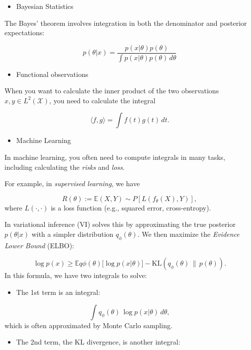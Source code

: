 \documentclass[
  letterpaper,
  DIV=11,
  numbers=noendperiod]{scrreprt}
\providecommand{\tightlist}{%
  \setlength{\itemsep}{0pt}\setlength{\parskip}{0pt}}
\begin{document}
\begin{itemize}
\tightlist
\item
  Bayesian Statistics
\end{itemize}

The Bayes' theorem involves integration in both the denominator and
posterior expectations:

\[
p(\theta|x) = \frac{p(x|\theta)p(\theta)}{\int p(x|\theta)p(\theta)\,d\theta}
\]

\begin{itemize}
\tightlist
\item
  Functional observations
\end{itemize}

When you want to calculate the inner product of the two observations
\(x,y\in L^2(\mathcal X)\), you need to calculate the integral

\[
\langle f,g \rangle = \int f(t)g(t)\,dt.
\]

\begin{itemize}
\tightlist
\item
  Machine Learning
\end{itemize}

In machine learning, you often need to compute integrals in many tasks,
including calculating the \emph{risks} and \emph{loss}.

For example, in \emph{supervised learning}, we have

\[R(\theta) := \mathbb E{(X,Y) \sim P}[L(f_\theta(X), Y)],
\] where \(L(\cdot,\cdot)\) is a loss function (e.g., squared error,
cross-entropy).

In variational inference (VI) solves this by approximating the true
posterior \(p(\theta|x)\) with a simpler distribution
\(q_\phi(\theta)\). We then maximize the \emph{Evidence Lower Bound}
(ELBO):

\[
\log p(x) \geq \mathbb{E}{q\phi(\theta)}\big[\log p(x|\theta)\big] - \text{KL}(q_\phi(\theta)\,\|\,p(\theta)).
\] In this formula, we have two integrals to solve:

\begin{itemize}
\tightlist
\item
  The 1st term is an integral:
\end{itemize}

\[\int q_\phi(\theta)\,\log p(x|\theta)\, d\theta,\] which is often
approximated by Monte Carlo sampling.

\begin{itemize}
\tightlist
\item
  The 2nd term, the KL divergence, is another integral:
\end{itemize}
\end{document}
